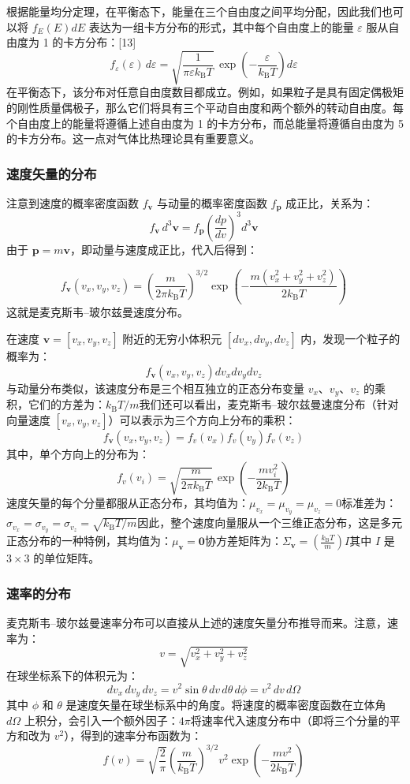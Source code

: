 根据能量均分定理，在平衡态下，能量在三个自由度之间平均分配，因此我们也可以将 $f_E(E) dE$ 表达为一组卡方分布的形式，其中每个自由度上的能量 $\varepsilon$ 服从自由度为 1 的卡方分布：[13]
$$
f_\varepsilon(\varepsilon)\, d\varepsilon = \sqrt{ \frac{1}{\pi \varepsilon k_{\text{B}} T} }\, \exp\left( -\frac{\varepsilon}{k_{\text{B}} T} \right) d\varepsilon~
$$
在平衡态下，该分布对任意自由度数目都成立。例如，如果粒子是具有固定偶极矩的刚性质量偶极子，那么它们将具有三个平动自由度和两个额外的转动自由度。每个自由度上的能量将遵循上述自由度为 1 的卡方分布，而总能量将遵循自由度为 5 的卡方分布。这一点对气体比热理论具有重要意义。
\subsubsection{速度矢量的分布}
注意到速度的概率密度函数 $f_{\mathbf{v}}$ 与动量的概率密度函数 $f_{\mathbf{p}}$ 成正比，关系为：
$$
f_{\mathbf{v}}\, d^3\mathbf{v} = f_{\mathbf{p}} \left( \frac{dp}{dv} \right)^3 d^3\mathbf{v}~
$$
由于 $\mathbf{p} = m \mathbf{v}$，即动量与速度成正比，代入后得到：

$$
f_{\mathbf{v}}(v_x, v_y, v_z) = \left( \frac{m}{2\pi k_{\text{B}} T} \right)^{3/2} \exp\left( -\frac{m (v_x^2 + v_y^2 + v_z^2)}{2 k_{\text{B}} T} \right)~
$$
这就是麦克斯韦–玻尔兹曼速度分布。

在速度 $\mathbf{v} = [v_x, v_y, v_z]$ 附近的无穷小体积元 $[dv_x, dv_y, dv_z]$ 内，发现一个粒子的概率为：
$$
f_{\mathbf{v}}(v_x, v_y, v_z) dv_x dv_y dv_z~
$$
与动量分布类似，该速度分布是三个相互独立的正态分布变量 $v_x$、$v_y$、$v_z$ 的乘积，它们的方差为：$k_{\text{B}} T/m$我们还可以看出，麦克斯韦–玻尔兹曼速度分布（针对向量速度 $[v_x, v_y, v_z]$）可以表示为三个方向上分布的乘积：
$$
f_{\mathbf{v}}(v_x, v_y, v_z) = f_v(v_x) f_v(v_y) f_v(v_z)~
$$
其中，单个方向上的分布为：
$$
f_v(v_i) = \sqrt{ \frac{m}{2\pi k_{\text{B}} T} }\, \exp\left( -\frac{m v_i^2}{2 k_{\text{B}} T} \right)~
$$
速度矢量的每个分量都服从正态分布，其均值为：$\mu_{v_x} = \mu_{v_y} = \mu_{v_z} = 0$标准差为：$\sigma_{v_x} = \sigma_{v_y} = \sigma_{v_z} = \sqrt{ k_{\text{B}} T/m }$因此，整个速度向量服从一个三维正态分布，这是多元正态分布的一种特例，其均值为：$\mu_{\mathbf{v}} = \mathbf{0}$协方差矩阵为：$\Sigma_{\mathbf{v}} = \left( \frac{k_{\text{B}} T}{m} \right) I$其中 $I$ 是 $3 \times 3$ 的单位矩阵。
\subsubsection{速率的分布}
麦克斯韦–玻尔兹曼速率分布可以直接从上述的速度矢量分布推导而来。注意，速率为：
$$
v = \sqrt{v_x^2 + v_y^2 + v_z^2}~
$$
在球坐标系下的体积元为：
$$
dv_x\, dv_y\, dv_z = v^2 \sin\theta\, dv\, d\theta\, d\phi = v^2\, dv\, d\Omega~
$$
其中 $\phi$ 和 $\theta$ 是速度矢量在球坐标系中的角度。将速度的概率密度函数在立体角 $d\Omega$ 上积分，会引入一个额外因子：$4\pi$将速率代入速度分布中（即将三个分量的平方和改为 $v^2$），得到的速率分布函数为：
$$
f(v) = \sqrt{\frac{2}{\pi}} \left( \frac{m}{k_{\text{B}} T} \right)^{3/2} v^2 \exp\left( -\frac{m v^2}{2 k_{\text{B}} T} \right)~
$$
